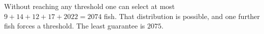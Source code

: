 Without reaching any threshold one can select at most $9+14+12+17+2022=2074$ fish. That distribution is possible, and one further fish forces a threshold. The least guarantee is $\boxed{2075}$.
